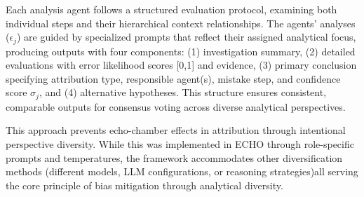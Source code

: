 \documentclass{article}
\begin{document}
Each analysis agent follows a structured evaluation protocol, examining both individual steps and their hierarchical context relationships. The agents' analyses ($\epsilon_j$) are guided by specialized prompts that reflect their assigned analytical focus, producing outputs with four components: (1) investigation summary, (2) detailed evaluations with error likelihood scores [0,1] and evidence, (3) primary conclusion specifying attribution type, responsible agent(s), mistake step, and confidence score $\sigma_j$, and (4) alternative hypotheses. This structure ensures consistent, comparable outputs for consensus voting across diverse analytical perspectives.

This approach prevents echo-chamber effects in attribution through intentional perspective diversity. While this was implemented in ECHO through role-specific prompts and temperatures, the framework accommodates other diversification methods (different models, LLM configurations, or reasoning strategies)\textemdash all serving the core principle of bias mitigation through analytical diversity.
\end{document}
